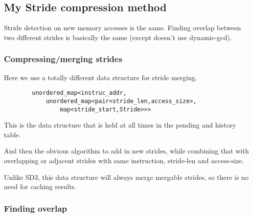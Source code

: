 \documentclass[12pt,twoside]{reedthesis}
\begin{document}





		\subsection{My Stride compression method}

		Stride detection on new memory accesses is the same. Finding overlap between two different strides is basically the same (except doesn't use dynamic-gcd).

		\subsubsection{Compressing/merging strides}

		Here we use a totally different data structure for stride merging.
		\begin{verbatim}
		unordered_map<instruc_addr,
		    unordered_map<pair<stride_len,access_size>,
		        map<stride_start,Stride>>>
		\end{verbatim}
		This is the data structure that is held at all times in the pending and history table.

		And then the obvious algorithm to add in new strides, while combining that with overlapping or adjacent strides with same instruction, stride-len and access-size.

		Unlike SD3, this data structure will always merge mergable strides, so there is no need for caching results.

		\subsubsection{Finding overlap}
\end{document}
